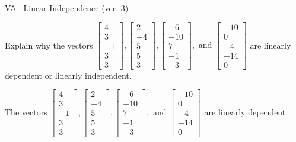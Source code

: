 \begin{exercise}
  \begin{exerciseTitle}V5 - Linear Independence (ver. 3)\end{exerciseTitle}
  \begin{exerciseStatement}
    Explain why the vectors \(\left[\begin{array}{r}
4 \\
3 \\
-1 \\
3 \\
3
\end{array}\right] , \left[\begin{array}{r}
2 \\
-4 \\
5 \\
5 \\
3
\end{array}\right] , \left[\begin{array}{r}
-6 \\
-10 \\
7 \\
-1 \\
-3
\end{array}\right] , \text{ and } \left[\begin{array}{r}
-10 \\
0 \\
-4 \\
-14 \\
0
\end{array}\right]\) are linearly dependent or linearly independent.	


  \end{exerciseStatement}
  \begin{exerciseAnswer}
   The vectors \(\left[\begin{array}{r}
4 \\
3 \\
-1 \\
3 \\
3
\end{array}\right] , \left[\begin{array}{r}
2 \\
-4 \\
5 \\
5 \\
3
\end{array}\right] , \left[\begin{array}{r}
-6 \\
-10 \\
7 \\
-1 \\
-3
\end{array}\right] , \text{ and } \left[\begin{array}{r}
-10 \\
0 \\
-4 \\
-14 \\
0
\end{array}\right]\) are 
  	 linearly dependent  .
  


  \end{exerciseAnswer}
\end{exercise}